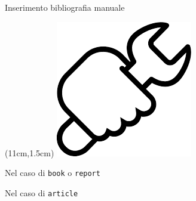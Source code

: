 \begin{frame}[fragile]{Inserimento bibliografia manuale}

\begin{textblock*}{2cm}(11cm,1.5cm)
      \includegraphics[scale=0.15]{res/images/manual}
\end{textblock*}

Nel caso di \texttt{book} o \texttt{report}

\vfill

Nel caso di \texttt{article}

\end{frame}